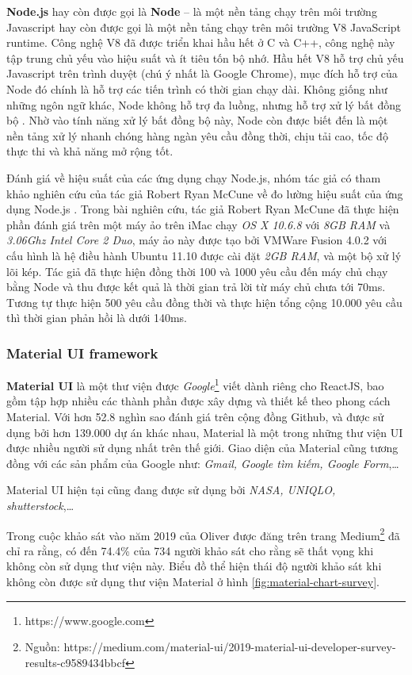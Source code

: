 \documentclass[../main-report.tex]{subfiles}
\begin{document}
\textbf{Node.js} hay còn được gọi là \textbf{Node} – là một nền tảng chạy trên môi trường Javascript hay còn được gọi là một nền tảng chạy trên môi trường V8 JavaScript runtime. Công nghệ V8 đã được triển khai hầu hết ở C và C++, công nghệ này tập trung chủ yếu vào hiệu suất và ít tiêu tốn bộ nhớ. Hầu hết V8 hỗ trợ chủ yếu Javascript trên trình duyệt (chú ý nhất là Google Chrome), mục đích hỗ trợ của Node đó chính là hỗ trợ các tiến trình có thời gian chạy dài. Không giống như những ngôn ngữ khác, Node không hỗ trợ đa luồng, nhưng hỗ trợ xử lý bất đồng bộ \cite{nodejs-performance}. Nhờ vào tính năng xử lý bất đồng bộ này, Node còn được biết đến là một nền tảng xử lý nhanh chóng hàng ngàn yêu cầu đồng thời, chịu tải cao, tốc độ thực thi và khả năng mở rộng tốt.

Đánh giá về hiệu suất của các ứng dụng chạy Node.js, nhóm tác giả có tham khảo nghiên cứu của tác giả Robert Ryan McCune về đo lường hiệu suất của ứng dụng Node.js \cite{mccune2011node}. Trong bài nghiên cứu, tác giả Robert Ryan McCune đã thực hiện phần đánh giá trên một máy ảo trên iMac chạy \textit{OS X 10.6.8} với \textit{8GB RAM} và \textit{3.06Ghz Intel Core 2 Duo}, máy ảo này được tạo bởi VMWare Fusion 4.0.2 với cấu hình là hệ điều hành Ubuntu 11.10 được cài đặt \textit{2GB RAM}, và một bộ xử lý lõi kép. Tác giả đã thực hiện đồng thời 100 và 1000 yêu cầu đến máy chủ chạy bằng Node và thu được kết quả là thời gian trả lời từ máy chủ chưa tới 70ms. Tương tự thực hiện 500 yêu cầu đồng thời và thực hiện tổng cộng 10.000 yêu cầu thì thời gian phản hồi là dưới 140ms.

\subsubsection{Material UI framework}
\textbf{Material UI} là một thư viện được \textit{Google}\footnote{https://www.google.com} viết dành riêng cho ReactJS, bao gồm tập hợp nhiều các thành phần được xây dựng và thiết kế theo phong cách Material. Với hơn 52.8 nghìn sao đánh giá trên cộng đồng Github, và được sử dụng bởi hơn 139.000 dự án khác nhau, Material là một trong những thư viện UI được nhiều người sử dụng nhất trên thế giới. Giao diện của Material cũng tương đồng với các sản phẩm của Google như: \textit{Gmail, Google tìm kiếm, Google Form},\ldots

Material UI hiện tại cũng đang được sử dụng bởi \textit{NASA, UNIQLO, shutterstock},\ldots

Trong cuộc khảo sát vào năm 2019 của Oliver được đăng trên trang Medium\footnote{Nguồn: https://medium.com/material-ui/2019-material-ui-developer-survey-results-c9589434bbcf} đã chỉ ra rằng, có đến 74.4\% của 734 người khảo sát cho rằng sẽ thất vọng khi không còn sử dụng thư viện này. Biểu đồ thể hiện thái độ người khảo sát khi không còn được sử dụng thư viện Material ở hình \ref{fig:material-chart-survey}.
\end{document}
